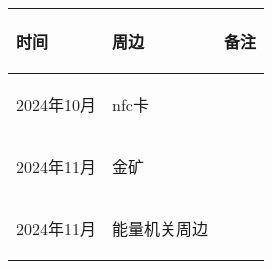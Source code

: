 
\begin{longtable}{ p{2cm} | p{7.8cm} | p{6cm} |}

    \hline

    \endfoot
    
    \rowcolor{tabhdcolor}

        \begin{center}
            时间
        \end{center} &
        \begin{center}
            周边
        \end{center} &
        \begin{center}
            备注
        \end{center} \\

    \hline

    \endhead

        \begin{center}
            2024年10月
        \end{center} &
        \begin{center}
            nfc卡
        \end{center} &
        \begin{center}
            
        \end{center} \\
        
    \hline

        \begin{center}
           2024年11月
        \end{center} &
        \begin{center}
            金矿
        \end{center} &
        \begin{center}
            
        \end{center} \\
        
    \hline
    
        \begin{center}
            2024年11月 
        \end{center} \cellcolor{gndcolor} &
        \begin{center}
            能量机关周边
        \end{center} \cellcolor{gndcolor} &
        \begin{center}
            

\end{center}
\end{longtable}
